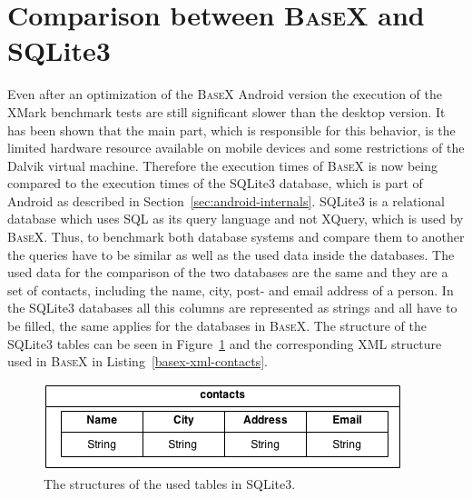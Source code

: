 \section{Comparison between \textsc{BaseX} and SQLite3}
\label{sec:comparison-between-basex-and-sqlite}
Even after an optimization of the \textsc{BaseX} Android version the execution of the XMark benchmark tests are still significant slower than the desktop version.
It has been shown that the main part, which is responsible for this behavior, is the limited hardware resource available on mobile devices and some restrictions of the Dalvik virtual machine.
Therefore the execution times of \textsc{BaseX} is now being compared to the execution times of the SQLite3 database, which is part of Android as described in Section~\ref{sec:android-internals}.
SQLite3 is a relational database which uses SQL as its query language and not XQuery, which is used by \textsc{BaseX}.
Thus, to benchmark both database systems and compare them to another the queries have to be similar as well as the used data inside the databases.
The used data for the comparison of the two databases are the same and they are a set of contacts, including the name, city, post- and email address of a person.
In the SQLite3 databases all this columns are represented as strings and all have to be filled, the same applies for the databases in \textsc{BaseX}.
The structure of the SQLite3 tables can be seen in Figure~\ref{fig:sqlite-tables-contacts} and the corresponding XML structure used in \textsc{BaseX} in Listing~\ref{basex-xml-contacts}.

\begin{figure}[h]
\begin{center}
\includegraphics[scale=0.65]{images/sqlite-tables.png} 
\caption{The structures of the used tables in SQLite3.}
\label{fig:sqlite-tables-contacts}
\end{center}
\end{figure}




